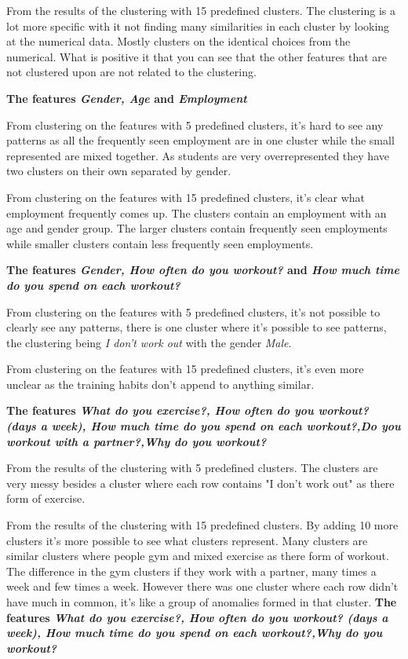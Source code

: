 \documentclass[a4paper]{article}
\begin{document}
From the results of the clustering with 15 predefined clusters. The clustering is a lot more specific with it not finding many similarities in each cluster by looking at the numerical data. Mostly clusters on the identical choices from the numerical. What is positive it that you can see that the other features that are not clustered upon are not related to the clustering.

\textbf{The features \textit{Gender, Age} and \textit{Employment}}


From clustering on the features with 5 predefined clusters, it's hard to see any patterns as all the frequently seen employment are in one cluster while the small represented are mixed together. As students are very overrepresented they have two clusters on their own separated by gender.

From clustering on the features with 15 predefined clusters, it's clear what employment frequently comes up. The clusters contain an employment with an age and gender group. The larger clusters contain frequently seen employments while smaller clusters contain less frequently seen employments.

\textbf{The features \textit{Gender, How often do you workout?} and \textit{How much time do you spend 
on each workout?}}

From clustering on the features with 5 predefined clusters, it's not possible to clearly see any patterns, there is one cluster where it's possible to see patterns, the clustering being \textit{I don't work out} with the gender \textit{Male}.

From clustering on the features with 15 predefined clusters, it's even more unclear as the training habits don't append to anything similar.

\textbf{The features \textit{What do you exercise?, How often do you workout? (days a week), How much time do you spend on each workout?,Do you workout with a partner?,Why do you workout?}}

From the results of the clustering with 5 predefined clusters. The clusters are very messy besides a cluster where each row contains "I don't work out" as there form of exercise.

From the results of the clustering with 15 predefined clusters. By adding 10 more clusters it's more possible to see what clusters represent. Many clusters are similar clusters where people gym and mixed exercise as there form of workout. The difference in the gym clusters if they work with a partner, many times a week and few times a week. However there was one cluster where each row didn't have much in common, it's like a group of anomalies formed in that cluster.
\newpage
\textbf{The features \textit{What do you exercise?, How often do you workout? (days a week), How much time do you spend on each workout?,Why do you workout?}}
\end{document}
